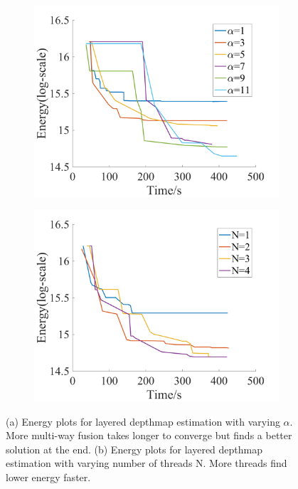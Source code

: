 \begin{figure}[!h]
  \centering
  \begin{subfigure}[b]{0.49\columnwidth}
    \centering
    \includegraphics[width=\columnwidth]{figure/layered_depthmap_by_alpha.png}
    \caption{}
    \label{fig:layered_depthmap_by_alpha}
  \end{subfigure}  
  \begin{subfigure}[b]{0.49\columnwidth}
    \centering
    \includegraphics[width=\columnwidth]{figure/layered_depthmap_by_N.png}
    \caption{}
    \label{fig:layered_depthmap_by_N}
  \end{subfigure}
  \caption{(a) Energy plots for layered depthmap estimation with varying
    $\alpha$. More multi-way fusion takes longer to converge but finds a better   
    solution at the end. (b) Energy plots for layered depthmap estimation with varying number of threads N. More threads find lower energy faster.}
  \label{fig:layered_depthmap_by_alpha_N}
\end{figure}


